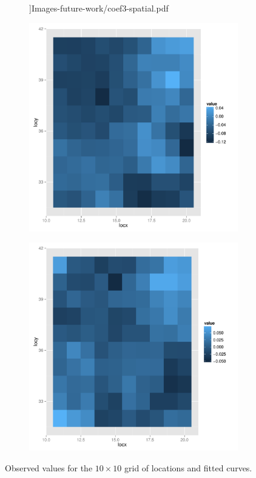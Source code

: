\begin{figure}
\begin{subfigure}
		\textwidth]{Images-future-work/coef3-spatial.pdf} 
	\end{subfigure}
	\begin{subfigure}
		[b]{0.3 
		\textwidth} \centering 
		\includegraphics[width= 
		\textwidth]{Images-future-work/coef4-spatial.pdf} 
	\end{subfigure}
	\begin{subfigure}
		[b]{0.3 
		\textwidth} \centering 
		\includegraphics[width= 
		\textwidth]{Images-future-work/coef5-spatial.pdf} 
	\end{subfigure}
	\caption{Observed values for the $10\times 10$ grid of locations and fitted curves.} \label{fig:estimated curves} 
\end{figure}

